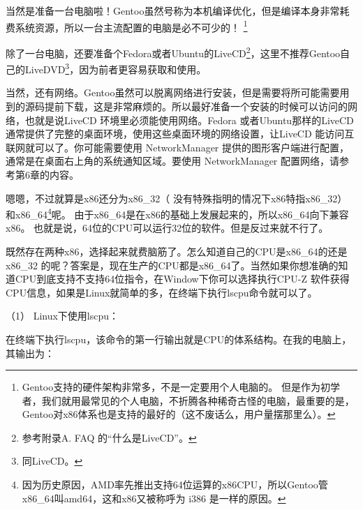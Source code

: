 \documentclass[amstex]{ctexbook}
\begin{document}
当然是准备一台电脑啦！Gentoo虽然号称为本机编译优化，但是编译本身非常耗费系统资源，所以一台主流配置的电脑是必不可少的！
\footnote{Gentoo支持的硬件架构非常多，不是一定要用个人电脑的。
但是作为初学者，我们就用最常见的个人电脑，不折腾各种稀奇古怪的电脑，最重要的是，Gentoo对x86体系也是支持的最好的（这不废话么，用户量摆那里么）。}


除了一台电脑，还要准备个Fedora或者Ubuntu的LiveCD\footnote{参考附录A. FAQ 的“什么是LiveCD”。
}，这里不推荐Gentoo自己的LiveDVD\footnote{同LiveCD。}，因为前者更容易获取和使用。

当然，还有网络。Gentoo虽然可以脱离网络进行安装，但是需要将所可能需要用到的源码提前下载，这是非常麻烦的。所以最好准备一个安装的时候可以访问的网络，也就是说LiveCD 环境里必须能使用网络。Fedora 或者Ubuntu那样的LiveCD 通常提供了完整的桌面环境，使用这些桌面环境的网络设置，让LiveCD 能访问互联网就可以了。你可能需要使用 NetworkManager 提供的图形客户端进行配置，通常是在桌面右上角的系统通知区域。要使用 NetworkManager 配置网络，请参考第6章的内容。

嗯嗯，不过就算是x86还分为x86\_32（ 没有特殊指明的情况下x86特指x86\_32） 和x86\_64\footnote{因为历史原因，AMD率先推出支持64位运算的x86CPU，所以Gentoo管x86\_64叫amd64，这和x86又被称呼为 i386 是一样的原因。}呢。
由于x86\_64是在x86的基础上发展起来的，所以x86\_64向下兼容x86。 也就是说，64位的CPU可以运行32位的软件。但是反过来就不行了。

既然存在两种x86，选择起来就费脑筋了。怎么知道自己的CPU是x86\_64的还是x86\_32 的呢？答案是，现在生产的CPU都是x86\_64了。当然如果你想准确的知道CPU到底支持不支持64位指令，在Window下你可以选择执行CPU-Z 软件获得CPU信息，如果是Linux就简单的多，在终端下执行lscpu命令就可以了。

（1）  Linux下使用lscpu：

在终端下执行lscpu，该命令的第一行输出就是CPU的体系结构。在我的电脑上，其输出为：
\end{document}
